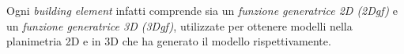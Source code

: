 Ogni \emph{building element} infatti comprende sia un \emph{funzione generatrice 2D (2Dgf)} e un
\emph{funzione generatrice 3D (3Dgf)}, utilizzate per ottenere modelli nella planimetria 2D e in 3D che ha generato il modello
rispettivamente.\\

